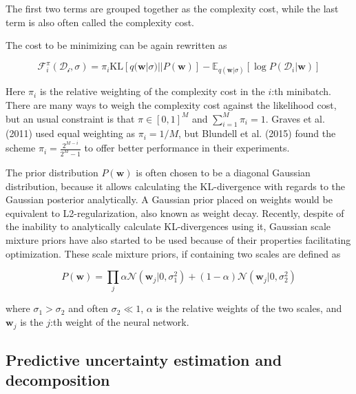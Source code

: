 	\vspace*{2mm}
	The first two terms are grouped together as the complexity cost, while the last term is also often called the complexity cost. 
	
	The cost to be minimizing can be again rewritten as 
	
	\begin{equation}
		\mathcal{F}^\pi_i(\mathcal{D_i}, \sigma) = \pi_i \text{KL}[q(\pmb{w}|\sigma) || P(\pmb{w})] - \mathbb{E}_{q(\pmb{w}|\sigma)}[\log P(\mathcal{D}_i|\pmb{w})]
	\end{equation}
	
	Here $\pi_i$ is the relative weighting of the complexity cost in the $i$:th minibatch. 
	There are many ways to weigh the complexity cost against the likelihood cost, but an usual constraint is that $\pi \in [0,1]^M$ and $\sum_{i=1}^{M} \pi_i = 1$. Graves et al. (2011) \cite{graves_practical_2011} used equal weighting as $\pi_i = 1/M$, but Blundell et al. (2015) \cite{blundell_weight_2015} found the scheme $\pi_i =\frac{2^{M-i}}{2^M - 1}$ to offer better performance in their experiments. 

	
	The prior distribution $P(\pmb{w})$ is often chosen to be a diagonal Gaussian distribution, because it allows calculating the KL-divergence with regards to the Gaussian posterior analytically. A Gaussian prior placed on weights would be equivalent to L2-regularization, also known as weight decay. Recently, despite of the inability to analytically calculate KL-divergences using it, Gaussian scale mixture priors have also started to be used \cite{blundell_weight_2015, shridhar_comprehensive_2019} because of their properties facilitating optimization. These scale mixture priors, if containing two scales are defined as 
	
	\begin{equation}
	\label{eq:gsm}
		P(\pmb{w}) = 
		\prod_{j}\alpha \mathcal{N}(\pmb{w}_j|0,\sigma_1^2) + (1-\alpha)\mathcal{N}(\pmb{w}_j|0,\sigma_2^2)
	\end{equation}  
	
	where $\sigma_1 > \sigma_2$ and often $\sigma_2 \ll 1$, $\alpha$ is the relative weights of the two scales, and $\pmb{w}_j$ is the $j$:th weight of the neural network. 
	
\subsection{Predictive uncertainty estimation and decomposition}

